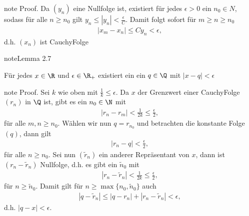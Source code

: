 \documentclass[letterpaper,10pt,english]{jupyterBook}
\begin{document}
\begin{sphinxadmonition}{note}
Proof.  Da \((y_n)\) eine Nullfolge ist, existiert für jedes \(\epsilon > 0\) ein \(n_0 \in N\), sodass für alle \(n \geq n_0\) gilt \(y_n \leq |y_n| < \frac{\epsilon}C\). Damit folgt sofort für \(m \geq n \geq n_0\)
\begin{equation*}
\begin{split}|x_m-x_n| \leq C y_n < \epsilon,\end{split}
\end{equation*}
d.h. \((x_n)\) ist Cauchy\sphinxhyphen{}Folge
\end{sphinxadmonition}
\label{grundlagen/zahlensysteme:lemma-23}
\begin{sphinxadmonition}{note}{Lemma 2.7}



Für jedes \(x \in \R\) und \(\epsilon \in \R_+\) existiert ein ein \(q \in \Q\) mit \(|x-q|<\epsilon\)
\end{sphinxadmonition}

\begin{sphinxadmonition}{note}
Proof.  Sei \(k\) wie oben mit \(\frac{1}k \leq \epsilon\). Da \(x\) der Grenzwert einer Cauchy\sphinxhyphen{}Folge \((r_n)\) in \(\Q\) ist, gibt es ein \(n_0 \in \N\) mit
\begin{equation*}
\begin{split}|r_n - r_m| < \frac{1}{2k} \leq \frac{\epsilon}2,\end{split}
\end{equation*}
für alle \(m,n \geq n_0\). Wählen wir nun \(q=r_{n_0}\) und betrachten die konstante Folge \((q)\), dann gilt
\begin{equation*}
\begin{split}|r_n - q| <  \frac{\epsilon}2,\end{split}
\end{equation*}
für alle \(n \geq n_0\). Sei nun \((\tilde r_n)\) ein anderer Repräsentant von \(x\), dann ist \((r_n - \tilde r_n)\) Nullfolge, d.h. es gibt ein \(\tilde n_0\) mit
\begin{equation*}
\begin{split}|r_n - \tilde r_n|   < \frac{1}{2k} \leq \frac{\epsilon}2,\end{split}
\end{equation*}
für \(n \geq \tilde n_0\). Damit gilt für \(n\geq \max\{n_0,\tilde n_0\}\) auch
\begin{equation*}
\begin{split}|q-\tilde r_n| \leq |q -r_n|+|r_n - \tilde r_n| < \epsilon,\end{split}
\end{equation*}
d.h. \(|q-x| < \epsilon\).
\end{sphinxadmonition}
\end{document}
